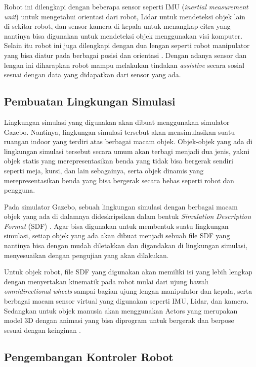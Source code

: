 Robot ini dilengkapi dengan beberapa sensor seperti IMU (\emph{inertial measurement unit}) untuk mengetahui orientasi dari robot, Lidar untuk mendeteksi objek lain di sekitar robot, dan sensor kamera di kepala untuk menangkap citra yang nantinya bisa digunakan untuk mendeteksi objek menggunakan visi komputer.
Selain itu robot ini juga dilengkapi dengan dua lengan seperti robot manipulator yang bisa diatur pada berbagai posisi dan orientasi \citep{Iqbal2012}.
Dengan adanya sensor dan lengan ini diharapkan robot mampu melakukan tindakan \emph{assistive} secara sosial sesuai dengan data yang didapatkan dari sensor yang ada.

\subsection{Pembuatan Lingkungan Simulasi}

Lingkungan simulasi yang digunakan akan dibuat menggunakan simulator Gazebo.
Nantinya, lingkungan simulasi tersebut akan mensimulasikan suatu ruangan indoor yang terdiri atas berbagai macam objek.
Objek-objek yang ada di lingkungan simulasi tersebut secara umum akan terbagi menjadi dua jenis, yakni objek statis yang merepresentasikan benda yang tidak bisa bergerak sendiri seperti meja, kursi, dan lain sebagainya, serta objek dinamis yang merepresentasikan benda yang bisa bergerak secara bebas seperti robot dan pengguna.

Pada simulator Gazebo, sebuah lingkungan simulasi dengan berbagai macam objek yang ada di dalamnya dideskripsikan dalam bentuk \emph{Simulation Description Format} (SDF) \citep{SdfFormat}.
Agar bisa digunakan untuk membentuk suatu lingkungan simulasi, setiap objek yang ada akan dibuat menjadi sebuah file SDF yang nantinya bisa dengan mudah diletakkan dan digandakan di lingkungan simulasi, menyesuaikan dengan pengujian yang akan dilakukan.

Untuk objek robot, file SDF yang digunakan akan memiliki isi yang lebih lengkap dengan menyertakan kinematik pada robot mulai dari ujung bawah \emph{omnidirectional wheels} sampai bagian ujung lengan manipulator dan kepala, serta berbagai macam sensor virtual yang digunakan seperti IMU, Lidar, dan kamera.
Sedangkan untuk objek manusia akan menggunakan Actors yang merupakan model 3D dengan animasi yang bisa diprogram untuk bergerak dan berpose sesuai dengan keinginan \citep{GazeboActors}.

\subsection{Pengembangan Kontroler Robot}

